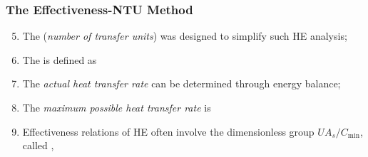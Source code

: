 \documentclass[10pt,compress,unknownkeysallowed]{beamer}
\begin{document}
\begin{frame}
  \frametitle{The Effectiveness-NTU Method}
     \begin{enumerate}\setcounter{enumi}{4}
          \item<1-> The  ({\it number of transfer units}) was designed to simplify such HE analysis;
          \item<2-> The  is defined as
          \item<2-> The {\it actual heat transfer rate} can be determined through energy balance;
          \item<3-> The {\it maximum possible heat transfer rate} is
          \item<4-> Effectiveness relations of HE often involve the dimensionless group $UA_{s}/C_{\text{min}}$, called ,
     \end{enumerate}

\end{frame}
\end{document}
